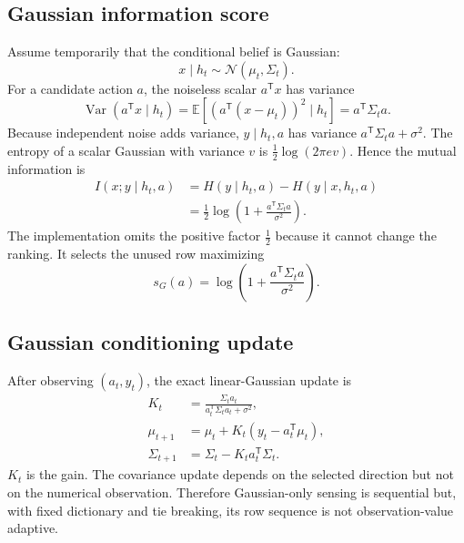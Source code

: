 \documentclass[11pt,a4paper]{article}
\newcommand{\E}{\mathbb{E}}
\newcommand{\Var}{\operatorname{Var}}
\newcommand{\trans}{^{\mathsf T}}
\begin{document}
\subsection{Gaussian information score}

Assume temporarily that the conditional belief is Gaussian:
\begin{equation}
x\mid h_t\sim\mathcal{N}(\mu_t,\Sigma_t).
\label{eq:gaussian-belief}
\end{equation}
For a candidate action $a$, the noiseless scalar $a\trans x$ has variance
\begin{equation}
\Var(a\trans x\mid h_t)
=\E\!\left[(a\trans(x-\mu_t))^2\mid h_t\right]
=a\trans\Sigma_t a .
\label{eq:projected-variance}
\end{equation}
Because independent noise adds variance, $y\mid h_t,a$ has variance
$a\trans\Sigma_ta+\sigma^2$.  The entropy of a scalar Gaussian with variance $v$ is
$\tfrac12\log(2\pi e v)$.  Hence the mutual information is
\begin{align}
I(x;y\mid h_t,a)
&=H(y\mid h_t,a)-H(y\mid x,h_t,a)\\
&=\frac12\log\!\left(1+\frac{a\trans\Sigma_ta}{\sigma^2}\right).
\label{eq:mutual-information}
\end{align}
The implementation omits the positive factor $\tfrac12$ because it cannot change the
ranking.  It selects the unused row maximizing
\begin{equation}
s_G(a)=\log\!\left(1+\frac{a\trans\Sigma_ta}{\sigma^2}\right).
\label{eq:gaussian-score}
\end{equation}

\subsection{Gaussian conditioning update}

After observing $(a_t,y_t)$, the exact linear-Gaussian update is
\begin{align}
K_t&=\frac{\Sigma_ta_t}{a_t\trans\Sigma_ta_t+\sigma^2}, \\
\mu_{t+1}&=\mu_t+K_t(y_t-a_t\trans\mu_t), \\
\Sigma_{t+1}&=\Sigma_t-K_ta_t\trans\Sigma_t .
\label{eq:gaussian-update}
\end{align}
$K_t$ is the gain.  The covariance update depends on the selected direction but not on the
numerical observation.  Therefore Gaussian-only sensing is sequential but, with fixed
dictionary and tie breaking, its row sequence is not observation-value adaptive.
\end{document}
